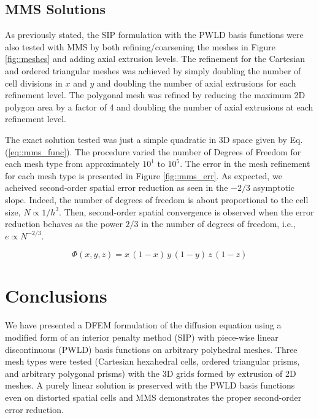 \documentclass{anstrans}
\begin{document}
\subsection{MMS Solutions}
\label{sec::MMS}

As previously stated, the SIP formulation with the PWLD basis functions were also tested with MMS by both refining/coarsening the meshes in Figure \ref{fig::meshes} and adding axial extrusion levels. The refinement for the Cartesian and ordered triangular meshes was achieved by simply doubling the number of cell divisions in $x$ and $y$ and doubling the number of axial extrusions for each refinement level. The polygonal mesh was refined by reducing the maximum 2D polygon area by a factor of 4 and doubling the number of axial extrusions at each refinement level.

The exact solution tested was just a simple quadratic in 3D space given by Eq. (\ref{eq::mms_func}). The procedure varied the number of Degrees of Freedom for each mesh type from approximately $10^1$ to $ 10^5$. The error in the mesh refinement for each mesh type is presented in Figure \ref{fig::mms_err}. As expected, we acheived second-order spatial error reduction as seen in the $-2/3$ asymptotic slope. Indeed, the number of degrees of freedom is about proportional to the cell size, $N \propto 1/h^3$. Then, second-order spatial convergence is observed  when the error reduction behaves as the power $2/3$ in the number of degrees of freedom, i.e., $e \propto N^{-2/3}$. 

\begin{equation}
\Phi (x,y,z) = x \, (1-x) \, y \, (1-y) \, z \, (1-z)
\label{eq::mms_func}
\end{equation}



\section{Conclusions}

We have presented a DFEM formulation of the diffusion equation using a modified form of an interior penalty method (SIP) with piece-wise linear discontinuous (PWLD) basis functions on arbitrary polyhedral meshes. Three mesh types were tested (Cartesian hexahedral cells, ordered triangular prisms, and arbitrary polygonal prisms) with the 3D grids formed by extrusion of 2D meshes. A purely linear solution is preserved with the PWLD basis functions even on distorted spatial cells and MMS demonstrates the proper second-order error reduction.
\end{document}
